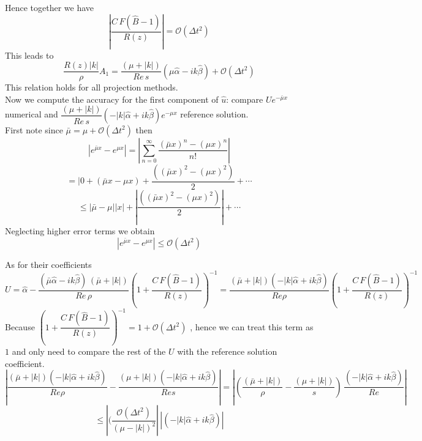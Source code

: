 Hence together we have 
\begin{equation}
|\dfrac{C \, F (\hat{B} - 1)}{R(z)}| = \mathcal{O} (\Delta t^2)
\end{equation}
This leads to 
\begin{equation*}
\dfrac{R(z) |k|}{\rho} A_1 = \dfrac{(\mu + |k|)}{Re \, s} (\mu \hat{\alpha} - ik \hat{\beta}) + \mathcal{O} (\Delta t^2)
\end{equation*}
This relation holds for all projection methods.\\

Now we compute the accuracy for the first component of $\hat{u}$: compare 
$U e^{-\bar{\mu} x}$ numerical and $\dfrac{(\mu + |k|)}{Re \,s} (- |k| \hat{\alpha} + ik \hat{\beta}) e^{-\mu x}$ reference solution.\\

First note since $\bar{\mu} = \mu + \mathcal{O} (\Delta t^2)$ then
\begin{equation*}
| e^{\bar{\mu}x} - e^{\mu x} | = | \sum_{n=0}^{\infty} \dfrac{(\bar{\mu} x)^n - (\mu x)^n}{n!} |
\end{equation*}
\begin{equation*}
= | 0 + (\bar{\mu}x - \mu x) + \dfrac{((\bar{\mu} x)^2 - (\mu x)^2)}{2} + \cdots
\end{equation*}
\begin{equation*}
\leq |\bar{\mu} - \mu| |x| + |\dfrac{((\bar{\mu} x)^2 - (\mu x)^2)}{2}| + \cdots
\end{equation*}
Neglecting higher error terms we obtain
\begin{equation*}
| e^{\bar{\mu}x} - e^{\mu x} | \leq \mathcal{O} (\Delta t^2)
\end{equation*}

As for their coefficients\\
\begin{equation*}
U = \hat{\alpha} - \dfrac{(\bar{\mu} \hat{\alpha} - ik \hat{\beta}) \, (\bar{\mu} + |k|)}{Re \, \rho} (1 + \dfrac{C\,F(\hat{B} - 1)}{R(z)})^{-1}
= \dfrac{(\bar{\mu} + |k|) (-|k| \hat{\alpha} + ik \hat{\beta})}{Re \rho} (1 + \dfrac{C\,F(\hat{B} - 1)}{R(z)})^{-1}
\end{equation*}
Because $(1 + \dfrac{C\,F(\hat{B} - 1)}{R(z)})^{-1} = 1 + \mathcal{O} (\Delta t^2)$ , hence we can treat this term as $1$ and only need to compare the rest of the $U$ with the reference solution coefficient.
\begin{equation*}
| \dfrac{(\bar{\mu} + |k|) (-|k| \hat{\alpha} + ik \hat{\beta})}{Re \rho} - \dfrac{(\mu + |k|) (-|k| \hat{\alpha} + ik \hat{\beta})}{Re s} |
= | (\dfrac{(\bar{\mu} + |k|)}{\rho} - \dfrac{(\mu + |k|)}{s}) \, \dfrac{(-|k| \hat{\alpha} + ik \hat{\beta})}{Re}|
\end{equation*}
\begin{equation*}
\leq | (\dfrac{\mathcal{O} (\Delta t^2)}{(\mu - |k|)^2}| \, |(-|k| \hat{\alpha} + ik \hat{\beta})|
\end{equation*}

